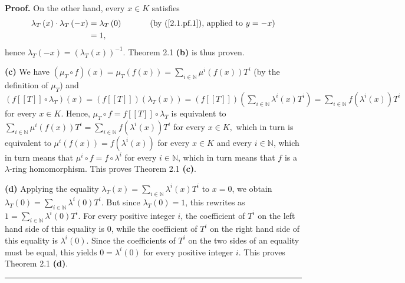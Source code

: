 \documentclass[numbers=enddot,12pt,final,onecolumn,notitlepage]{scrartcl}%
\newenvironment{proof}[1][Proof]{\noindent\textbf{#1.} }{\ \rule{0.5em}{0.5em}}
\begin{document}
\begin{proof}
On the other hand, every $x\in K$ satisfies
\begin{align*}
\lambda_{T}\left(  x\right)  \cdot\lambda_{T}\left(  -x\right)   &
=\lambda_{T}\left(  0\right)  \ \ \ \ \ \ \ \ \ \ \left(  \text{by
(\ref{2.1.pf.1}), applied to }y=-x\right) \\
&  =1,
\end{align*}
hence $\lambda_{T}\left(  -x\right)  =\left(  \lambda_{T}\left(  x\right)
\right)  ^{-1}$. Theorem 2.1 \textbf{(b)} is thus proven.

\textbf{(c)} We have $\left(  \mu_{T}\circ f\right)  \left(  x\right)
=\mu_{T}\left(  f\left(  x\right)  \right)  =\sum\limits_{i\in\mathbb{N}}%
\mu^{i}\left(  f\left(  x\right)  \right)  T^{i}$ (by the definition of
$\mu_{T}$) and $\left(  f\left[  \left[  T\right]  \right]  \circ\lambda
_{T}\right)  \left(  x\right)  =\left(  f\left[  \left[  T\right]  \right]
\right)  \left(  \lambda_{T}\left(  x\right)  \right)  =\left(  f\left[
\left[  T\right]  \right]  \right)  \left(  \sum\limits_{i\in\mathbb{N}%
}\lambda^{i}\left(  x\right)  T^{i}\right)  =\sum\limits_{i\in\mathbb{N}%
}f\left(  \lambda^{i}\left(  x\right)  \right)  T^{i}$ for every $x\in K$.
Hence, $\mu_{T}\circ f=f\left[  \left[  T\right]  \right]  \circ\lambda_{T}$
is equivalent to $\sum\limits_{i\in\mathbb{N}}\mu^{i}\left(  f\left(
x\right)  \right)  T^{i}=\sum\limits_{i\in\mathbb{N}}f\left(  \lambda
^{i}\left(  x\right)  \right)  T^{i}$ for every $x\in K,$ which in turn is
equivalent to $\mu^{i}\left(  f\left(  x\right)  \right)  =f\left(
\lambda^{i}\left(  x\right)  \right)  $ for every $x\in K$ and every
$i\in\mathbb{N}$, which in turn means that $\mu^{i}\circ f=f\circ\lambda^{i}$
for every $i\in\mathbb{N}$, which in turn means that $f$ is a $\lambda$-ring
homomorphism. This proves Theorem 2.1 \textbf{(c)}.

\textbf{(d)} Applying the equality $\lambda_{T}\left(  x\right)
=\sum\limits_{i\in\mathbb{N}}\lambda^{i}\left(  x\right)  T^{i}$ to $x=0$, we
obtain $\lambda_{T}\left(  0\right)  =\sum\limits_{i\in\mathbb{N}}\lambda
^{i}\left(  0\right)  T^{i}$. But since $\lambda_{T}\left(  0\right)  =1$,
this rewrites as $1=\sum\limits_{i\in\mathbb{N}}\lambda^{i}\left(  0\right)
T^{i}$. For every positive integer $i$, the coefficient of $T^{i}$ on the left
hand side of this equality is $0$, while the coefficient of $T^{i}$ on the
right hand side of this equality is $\lambda^{i}\left(  0\right)  $. Since the
coefficients of $T^{i}$ on the two sides of an equality must be equal, this
yields $0=\lambda^{i}\left(  0\right)  $ for every positive integer $i$. This
proves Theorem 2.1 \textbf{(d)}.
\end{proof}
\end{document}
